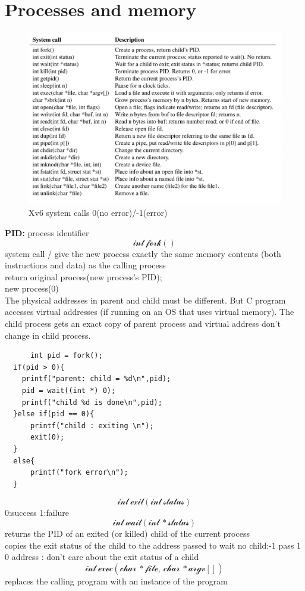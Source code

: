 \documentclass{thuemp}
\begin{document}
\section*{Processes and memory}
\begin{figure}[H]
	\centering
	\includegraphics[width=0.8\linewidth]{./image/1.2.png}
	\caption{Xv6 system calls 0(no error)/-1(error)} 
	\label{png:1.2}
\end{figure}
\textbf{PID:} process identifier
$$\mathcal{int \ fork()}$$
system call / give the new process exactly the same memory contents (both instructions and data) as the calling process\\
return original process(new process's PID);\\
new process(0)\\
The physical addresses in parent and child must be different. But C program accesses virtual addresses (if running on an OS that uses virtual memory). The child process gets an exact copy of parent process and virtual address don't change in child process. 
\begin{lstlisting}
      int pid = fork();
  if(pid > 0){
    printf("parent: child = %d\n",pid);
    pid = wait((int *) 0);
    printf("child %d is done\n",pid);
  }else if(pid == 0){
      printf("child : exiting \n");
      exit(0);
  }
  else{
      printf("fork error\n");
  }
\end{lstlisting}
$$\mathcal{int\ exit(int\ status)}$$
0:success
1:failure 
$$\mathcal{int \ wait(int \ *status)}$$
returns the PID of an exited 
(or killed) child of the current process\\ 
copies the exit status of the child to the 
address passed to wait 
no child:-1
pass 1 0 address : don't care about the exit status of a child
$$\mathcal{int \ exec(char \ *file,\ char \ *argv[])}$$
replaces the calling program with an instance of the program\\
\end{document}
